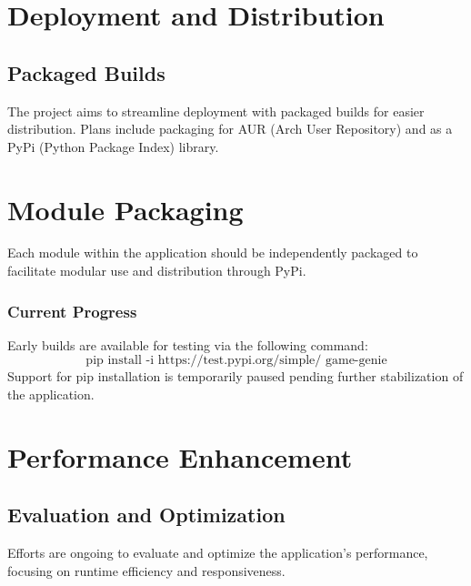 




\section*{Deployment and Distribution}

\subsection*{Packaged Builds}

The project aims to streamline deployment with packaged builds for easier distribution. Plans include packaging for AUR (Arch User Repository) and as a PyPi (Python Package Index) library.

\section*{Module Packaging}

Each module within the application should be independently packaged to facilitate modular use and distribution through PyPi.

\subsubsection*{Current Progress}

Early builds are available for testing via the following command:
\[
\text{pip install -i https://test.pypi.org/simple/ game-genie}
\]
Support for pip installation is temporarily paused pending further stabilization of the application.

\section*{Performance Enhancement}

\subsection*{Evaluation and Optimization}

Efforts are ongoing to evaluate and optimize the application's performance, focusing on runtime efficiency and responsiveness.

